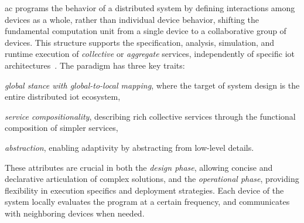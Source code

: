 \documentclass[12pt, a4paper]{article}
\newenvironment{inlinelist}{\begin{enumerate*}[label=\emph{(\roman*)}]}{\end{enumerate*}}
\begin{document}
\ac{ac} programs the behavior of a distributed system by defining interactions among devices as a whole,
rather than individual device behavior,
shifting the fundamental computation unit from a single device to a collaborative group of devices.
%
This structure supports the specification, analysis, simulation,
and runtime execution of \emph{collective} or \emph{aggregate} services,
independently of specific \ac{iot} architectures~\cite{FI2020-pulverization}.
%
The paradigm has three key traits:
\begin{inlinelist}
    \item \emph{global stance with global-to-local mapping}, where the target of system design is the entire distributed \ac{iot} ecosystem,
    \item \emph{service compositionality}, describing rich collective services through the functional composition of simpler services,
    \item \emph{abstraction}, enabling adaptivity by abstracting from low-level details.
\end{inlinelist}
%
These attributes are crucial in both the \emph{design phase},
allowing concise and declarative articulation of complex solutions,
and the \emph{operational phase},
providing flexibility in execution specifics and deployment strategies.
%
Each device of the system locally evaluates the program at a certain frequency,
and communicates with neighboring devices when needed.
\end{document}
